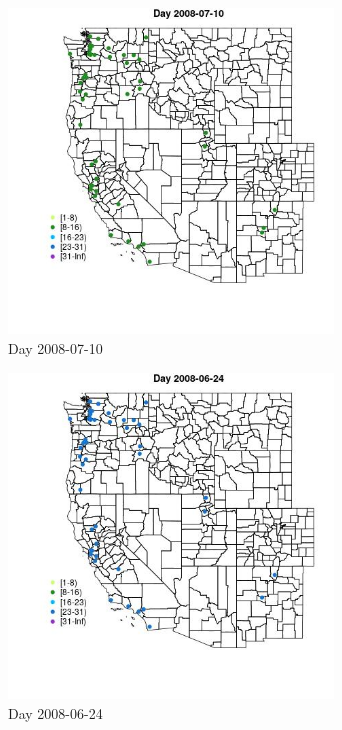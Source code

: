 \begin{figure} 
\centering  
\includegraphics[width=0.77\textwidth]{Code_Outputs/Report_ML_input_PM25_Step4_part_e_de_duplicated_aves_MapObsDay2008-07-10.jpg} 
\caption{\label{fig:Report_ML_input_PM25_Step4_part_e_de_duplicated_avesMapObsDay2008-07-10}Day 2008-07-10} 
\end{figure} 
 

\begin{figure} 
\centering  
\includegraphics[width=0.77\textwidth]{Code_Outputs/Report_ML_input_PM25_Step4_part_e_de_duplicated_aves_MapObsDay2008-06-24.jpg} 
\caption{\label{fig:Report_ML_input_PM25_Step4_part_e_de_duplicated_avesMapObsDay2008-06-24}Day 2008-06-24} 
\end{figure} 
 

